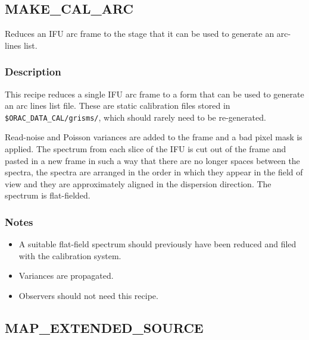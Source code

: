 \documentclass[twoside,11pt,nolof]{starlink}
\begin{document}
\clearpage
\subsection{MAKE\_CAL\_ARC}



Reduces an IFU arc frame to the stage that it can be used to generate
an arc-lines list.

\subsubsection*{Description}

This recipe reduces a single IFU arc frame to a form that can be used
to generate an arc lines list file. These are static calibration files
stored in \texttt{\$ORAC\_DATA\_CAL/grisms/}, which should rarely need to
be re-generated.


Read-noise and Poisson variances are added to the frame and a bad
pixel mask is applied. The spectrum from each slice of the IFU is cut
out of the frame and pasted in a new frame in such a way that there
are no longer spaces between the spectra, the spectra are arranged in
the order in which they appear in the field of view and they are
approximately aligned in the dispersion direction. The spectrum is
flat-fielded.


\subsubsection*{Notes}

\begin{itemize}
\item

  A suitable flat-field spectrum should previously
  have been reduced and filed with the calibration system.

\item

Variances are propagated.

\item

Observers should not need this recipe.

\end{itemize}

\clearpage

\subsection{MAP\_EXTENDED\_SOURCE}
\end{document}
